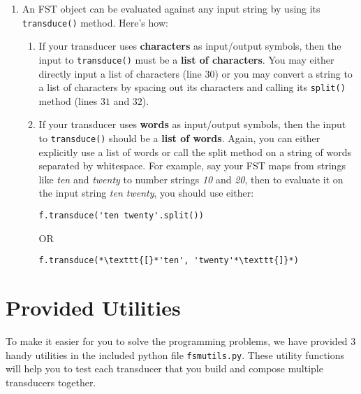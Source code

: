 \documentclass[11pt]{article}
\begin{document}
\begin{enumerate}
	 $\epsilon$'s may be indicated by an empty set of parentheses
         or square brackets, depending on the context. (line $25$).
	 \item An FST object can be evaluated against any input string
           by using its \texttt{transduce()} method. Here's how:
	\begin{enumerate}
		\item If your transducer uses \textbf{characters} as
                  input/output symbols, then the input to
                  \texttt{transduce()} must be a \textbf{list of
                    characters}. You may either directly input a list
                  of characters (line $30$) or you may convert a
                  string to a list of characters by spacing out its
                  characters and calling its \texttt{split()} method
                  (lines $31$ and $32$).
		\item If your transducer uses \textbf{words} as
                  input/output symbols, then the input to
                  \texttt{transduce()} should be a \textbf{list of
                    words}. Again, you can either explicitly use a
                  list of words or call the split method on a string
                  of words separated by whitespace. For example, say
                  your FST maps from strings like \emph{ten} and
                  \emph{twenty} to number strings \emph{10} and
                  \emph{20}, then to evaluate it on the input string
                  \emph{ten twenty}, you should use either:
		\begin{lstlisting}[label=foo2, frame=trBL,escapechar=*]
		f.transduce('ten twenty'.split())
		\end{lstlisting}
		\begin{center}{OR}\end{center}
		\begin{lstlisting}[label=foo3, frame=trBL,escapechar=*]
		f.transduce(*\texttt{[}*'ten', 'twenty'*\texttt{]}*)
		\end{lstlisting}
	\end{enumerate}
\end{enumerate}

\section*{Provided Utilities}
To make it easier for you to solve the programming problems,
we have provided $3$ handy utilities in the included python file
\texttt{fsmutils.py}. These utility functions will help you to test
each transducer that you build and compose multiple transducers
together.  
\end{document}
